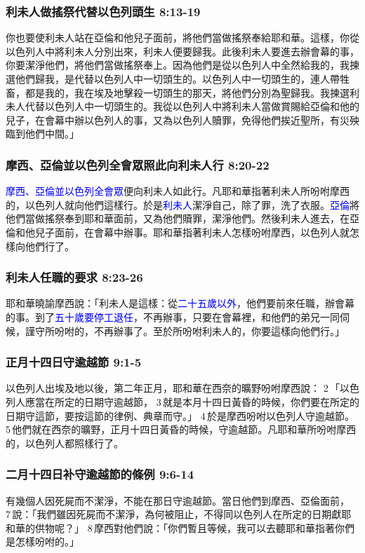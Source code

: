 \subsubsection{利未人做搖祭代替以色列頭生 8:13-19}
你也要使利未人站在亞倫和他兒子面前，將他們當做搖祭奉給耶和華。這樣，你從以色列人中將利未人分別出來，利未人便要歸我。此後利未人要進去辦會幕的事，你要潔淨他們，將他們當做搖祭奉上。因為他們是從以色列人中全然給我的，我揀選他們歸我，是代替以色列人中一切頭生的。以色列人中一切頭生的，連人帶牲畜，都是我的，我在埃及地擊殺一切頭生的那天，將他們分別為聖歸我。我揀選利未人代替以色列人中一切頭生的。我從以色列人中將利未人當做賞賜給亞倫和他的兒子，在會幕中辦以色列人的事，又為以色列人贖罪，免得他們挨近聖所，有災殃臨到他們中間。」

\subsubsection{摩西、亞倫並以色列全會眾照此向利未人行 8:20-22}
\textcolor{blue}{摩西、亞倫並以色列全會眾}便向利未人如此行。凡耶和華指著利未人所吩咐摩西的，以色列人就向他們這樣行。於是\textcolor{blue}{利未人}潔淨自己，除了罪，洗了衣服。\textcolor{blue}{亞倫}將他們當做搖祭奉到耶和華面前，又為他們贖罪，潔淨他們。然後利未人進去，在亞倫和他兒子面前，在會幕中辦事。耶和華指著利未人怎樣吩咐摩西，以色列人就怎樣向他們行了。

\subsubsection{利未人任職的要求 8:23-26}
耶和華曉諭摩西說：「利未人是這樣：從\textcolor{blue}{二十五歲以外}，他們要前來任職，辦會幕的事。到了\textcolor{blue}{五十歲要停工退任}，不再辦事，只要在會幕裡，和他們的弟兄一同伺候，謹守所吩咐的，不再辦事了。至於所吩咐利未人的，你要這樣向他們行。」


\subsubsection{正月十四日守逾越節 9:1-5}
\noindent
以色列人出埃及地以後，第二年正月，耶和華在西奈的曠野吩咐摩西說： 2 「以色列人應當在所定的日期守逾越節， 3 就是本月十四日黃昏的時候，你們要在所定的日期守這節，要按這節的律例、典章而守。」 4 於是摩西吩咐以色列人守逾越節。 5 他們就在西奈的曠野，正月十四日黃昏的時候，守逾越節。凡耶和華所吩咐摩西的，以色列人都照樣行了。
 
\subsubsection{二月十四日补守逾越節的條例  9:6-14 }
有幾個人因死屍而不潔淨，不能在那日守逾越節。當日他們到摩西、亞倫面前， 7 說：「我們雖因死屍而不潔淨，為何被阻止，不得同以色列人在所定的日期獻耶和華的供物呢？」 8 摩西對他們說：「你們暫且等候，我可以去聽耶和華指著你們是怎樣吩咐的。」


